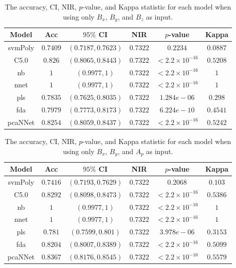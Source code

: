 \documentclass[preprint,12pt]{elsarticle}
\begin{document}
\begin{table}[!ht]
	\centering
	\begin{tabular}{|c|c|c|c|c|c|}
		\hline
		Model & Acc & $95\%$ CI & NIR & $p$-value & Kappa \\ \hline
		svmPoly & $0.7409$ & $(0.7187, 0.7623)$ & $0.7322$ & $0.2234$ & $0.0887$ \\ \hline
		C5.0 & $0.826$ & $(0.8065, 0.8443)$ & $0.7322$ & $< 2.2 \times {10}^{-16}$ & $0.5208$ \\ \hline
		nb & $1$ & $(0.9977, 1)$ & $0.7322$ & $< 2.2 \times {10}^{-16}$ & $1$ \\ \hline
		nnet & $1$ & $(0.9977, 1)$ & $0.7322$ & $< 2.2 \times {10}^{-16}$ & $1$ \\ \hline
		pls & $0.7835$ & $(0.7625, 0.8035)$ & $0.7322$ & $1.284e-06$ & $0.298$ \\ \hline
		fda & $0.7979$ & $(0.7773, 0.8173)$ & $0.7322$ & $6.224e-10$ & $0.4541$ \\ \hline
		pcaNNet & $0.8254$ & $(0.8059, 0.8437)$ & $0.7322$ & $< 2.2 \times {10}^{-16}$ & $0.5242$ \\ \hline
	\end{tabular}
	\caption{The accuracy, CI, NIR, $p$-value, and Kappa statistic for each model when using only $B_{x}$, $B_{y}$, and $B_{z}$ as input.}
	\label{tab:stats:reverse:coord}
\end{table}

\begin{table}[!ht]
	\centering
	\begin{tabular}{|c|c|c|c|c|c|}
		\hline
		Model & Acc & $95\%$ CI & NIR & $p$-value & Kappa \\ \hline
		svmPoly & $0.7416$ & $(0.7193, 0.7629)$ & $0.7322$ & $0.2068$ & $0.103$ \\ \hline
		C5.0 & $0.8292$ & $(0.8098, 0.8473)$ & $0.7322$ & $< 2.2 \times {10}^{-16}$ & $0.5386$ \\ \hline
		nb & $1$ & $(0.9977, 1)$ & $0.7322$ & $< 2.2 \times {10}^{-16}$ & $1$ \\ \hline
		nnet & $1$ & $(0.9977, 1)$ & $0.7322$ & $< 2.2 \times {10}^{-16}$ & $1$ \\ \hline
		pls & $0.781$ & $(0.7599, 0.801)$ & $0.7322$ & $3.978e-06$ & $0.3153$ \\ \hline
		fda & $0.8204$ & $(0.8007, 0.8389)$ & $0.7322$ & $< 2.2 \times {10}^{-16}$ & $0.5099$ \\ \hline
		pcaNNet & $0.8367$ & $(0.8176, 0.8545)$ & $0.7322$ & $< 2.2 \times {10}^{-16}$ & $0.5579$ \\ \hline
	\end{tabular}
	\caption{The accuracy, CI, NIR, $p$-value, and Kappa statistic for each model when using only $B_{x}$, $B_{y}$, and $A_{p}$ as input.}
	\label{tab:stats:reverse:xyap}
\end{table}
\end{document}
